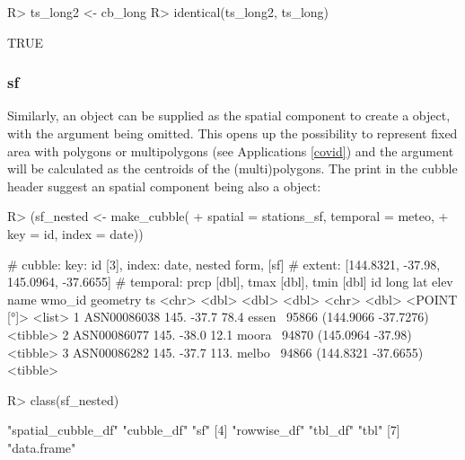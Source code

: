 \documentclass[
  shortnames]{jss}
\begin{document}
\begin{CodeChunk}
\begin{CodeInput}
R> ts_long2 <- cb_long %
R> identical(ts_long2, ts_long)
\end{CodeInput}
\begin{CodeOutput}
[1] TRUE
\end{CodeOutput}
\end{CodeChunk}

\hypertarget{sf}{%
\subsubsection{sf}\label{sf}}

Similarly, an  object can be supplied as the spatial component to create a  object, with the  argument being omitted. This opens up the possibility to represent fixed area with polygons or multipolygons (see Applications \ref{covid}) and the  argument will be calculated as the centroids of the (multi)polygons. The \code{[sf]} print in the cubble header suggest an spatial component being also a  object:

\begin{CodeChunk}
\begin{CodeInput}
R> (sf_nested <- make_cubble(
+   spatial = stations_sf, temporal = meteo, 
+   key = id, index = date))
\end{CodeInput}
\begin{CodeOutput}
# cubble:   key: id [3], index: date, nested form, [sf]
# extent:   [144.8321, -37.98, 145.0964, -37.6655]
# temporal: prcp [dbl], tmax [dbl], tmin [dbl]
  id           long   lat  elev name   wmo_id            geometry ts      
  <chr>       <dbl> <dbl> <dbl> <chr>   <dbl>         <POINT [°]> <list>  
1 ASN00086038  145. -37.7  78.4 essen~  95866 (144.9066 -37.7276) <tibble>
2 ASN00086077  145. -38.0  12.1 moora~  94870   (145.0964 -37.98) <tibble>
3 ASN00086282  145. -37.7 113.  melbo~  94866 (144.8321 -37.6655) <tibble>
\end{CodeOutput}
\begin{CodeInput}
R> class(sf_nested)
\end{CodeInput}
\begin{CodeOutput}
[1] "spatial_cubble_df" "cubble_df"         "sf"               
[4] "rowwise_df"        "tbl_df"            "tbl"              
[7] "data.frame"       
\end{CodeOutput}
\end{CodeChunk}
\end{document}
